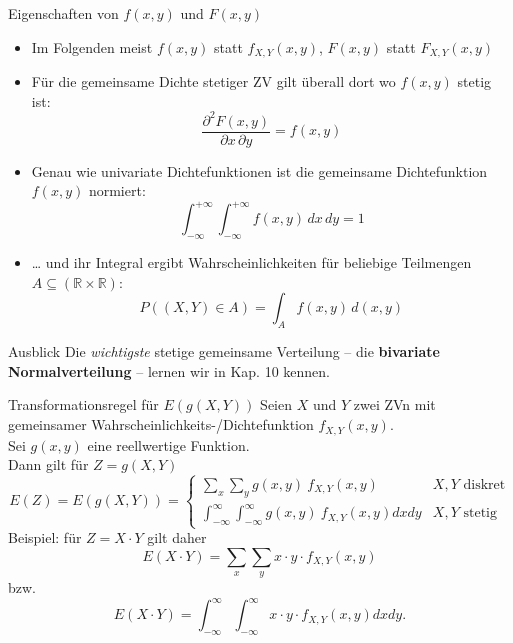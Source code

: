 \documentclass[
  10pt,
  ignorenonframetext,
]{beamer}
\providecommand{\tightlist}{%
  \setlength{\itemsep}{0pt}\setlength{\parskip}{0pt}}
\begin{document}
\begin{frame}{Eigenschaften von \(f(x,y)\) und \(F(x,y)\)}
\protect\hypertarget{eigenschaften-von-fxy-und-fxy}{}
\begin{itemize}
\tightlist
\item
  Im Folgenden meist \(f(x,y)\) statt \(f_{X,Y}(x,y)\), \(F(x,y)\) statt
  \(F_{X,Y}(x,y)\)
\item
  Für die gemeinsame Dichte stetiger ZV gilt überall dort wo \(f(x,y)\)
  stetig ist: \[
  \frac{\partial^2 F(x,y)}{\partial x \, \partial y} = f(x,y)
  \]
\item
  Genau wie univariate Dichtefunktionen ist die gemeinsame
  Dichtefunktion \(f(x,y)\) normiert: \[
  \int_{-\infty}^{+\infty} \int_{-\infty}^{+\infty} f(x,y) \, dx \, dy = 1
  \]
\item
  \ldots{} und ihr Integral ergibt Wahrscheinlichkeiten für beliebige
  Teilmengen \(A \subseteq (\mathbb{R} \times \mathbb{R})\): \[
  P((X, Y) \in A) = \int_{A} f(x, y)\, d (x, y)
  \]
\end{itemize}

\begin{block}{Ausblick}
\protect\hypertarget{ausblick}{}
Die \emph{wichtigste} stetige gemeinsame Verteilung -- die
\textbf{bivariate Normalverteilung} -- lernen wir in Kap. 10 kennen.
\end{block}

\end{frame}

\begin{frame}{Transformationsregel für \(E(g(X, Y))\)}
\protect\hypertarget{transformationsregel-fuxfcr-egx-y}{}
Seien \(X\) und \(Y\) zwei ZVn mit gemeinsamer
Wahrscheinlichkeits-/Dichtefunktion \(f_{X,Y}(x,y)\).\\
Sei \(g(x, y)\) eine reellwertige Funktion.\\
Dann gilt für \(Z = g(X, Y)\) \[
E(Z)=E(g(X, Y)) = \begin{cases} \sum_x \sum_y g(x,y) \: f_{X,Y}(x,y) & X, Y \text{ diskret}\\
\int_{-\infty}^{\infty} \int_{-\infty}^{\infty} g(x,y) \: f_{X,Y}(x,y) dx dy & X, Y \text{ stetig}
\end{cases}
\] Beispiel: für \(Z = X \cdot Y\) gilt daher \[
E(X \cdot Y) = \sum_x \sum_y x \cdot y \cdot  f_{X,Y}(x,y)
\] bzw. \[
E(X \cdot Y) =  \int_{-\infty}^{\infty} \int_{-\infty}^{\infty} x \cdot y \cdot  f_{X,Y}(x,y)dx dy  \mbox{.}
\]
\end{frame}
\end{document}
